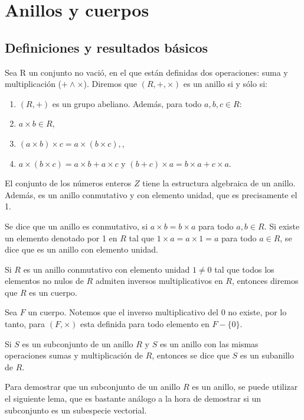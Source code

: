 \section{Anillos y cuerpos}
\subsection{Definiciones y resultados básicos}
\begin{defi}
Sea R un conjunto no vació, en el que están definidas dos operaciones: suma y multiplicación ($+ \land \times$). Diremos que $(R,+,\times)$ es un anillo si y sólo si:
\begin{enumerate}
    \item $(R,+)$ es un grupo abeliano. Además, para todo $a,b,c \in R$:
    \item $a\times b\in R$,
    \item $(a\times b)\times c = a\times (b\times c),$,
    \item $a\times (b\times c) = a\times b + a\times c$ y $(b+c)\times a = b\times a + c\times a$.
\end{enumerate}
\end{defi}
\begin{ejemplo}
El conjunto de los números enteros $Z$ tiene la estructura algebraica de un anillo. Además, es un anillo conmutativo y con elemento unidad, que es precisamente el 1.
\end{ejemplo}
Se dice que un anillo es conmutativo, si $a\times b = b\times a$ para todo $a,b\in R$. Si existe un elemento denotado por 1 en $R$ tal que $1\times a = a\times 1 = a$ para todo $a\in R$, se dice que es un anillo con elemento unidad.
\begin{defi}
Si $R$ es un anillo conmutativo con elemento unidad $1\neq 0$ tal que todos los elementos no nulos de $R$ admiten inversos multiplicativos en $R$, entonces diremos que $R$ es un cuerpo.
\end{defi}
Sea $F$ un cuerpo. Notemos que el inverso multiplicativo del 0 no existe, por lo tanto, para $(F,\times)$ esta definida para todo elemento en $F-\lbrace 0\rbrace$.
\begin{defi}
Si $S$ es un subconjunto de un anillo $R$ y $S$ es un anillo con las mismas operaciones sumas y multiplicación de $R$, entonces se dice que $S$ es un subanillo de $R$.
\end{defi}
Para demostrar que un subconjunto de un anillo $R$ es un anillo, se puede utilizar el siguiente lema, que es bastante análogo a la hora de demostrar si un subconjunto es un subespecie vectorial.
